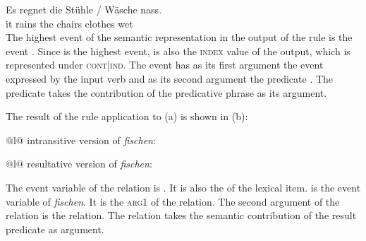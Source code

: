 \ea
\gll Es regnet die Stühle / Wäsche nass.\\
     it rains  the chairs {} clothes wet\\
\z
The highest event of the semantic representation in the output of the rule is the  event
. Since  is the highest event,  is also the \textsc{index} value of
the output, which is represented under \textsc{cont|ind}. The  event has as its first
argument the event expressed by the input verb  and as its second argument the
 predicate . The  predicate takes the contribution of the
predicative phrase  as its argument. 

The result of the rule application to (a) is shown in (b):
\eal
\ex
\begin{tabular}[t]{@{}l@{}}
intransitive version of \emph{fischen}:\\
\end{tabular}

\ex 
\begin{tabular}[t]{@{}l@{}}
resultative version of \emph{fischen}:\\
\end{tabular}
\zl
The event variable of the  relation is . It is also the \indv of the lexical item.
 is the event variable of \emph{fischen}. It is the \textsc{arg1} of the 
relation. The second argument of the  relation is the  relation. The
 relation takes the semantic contribution of the result predicate  as argument.

